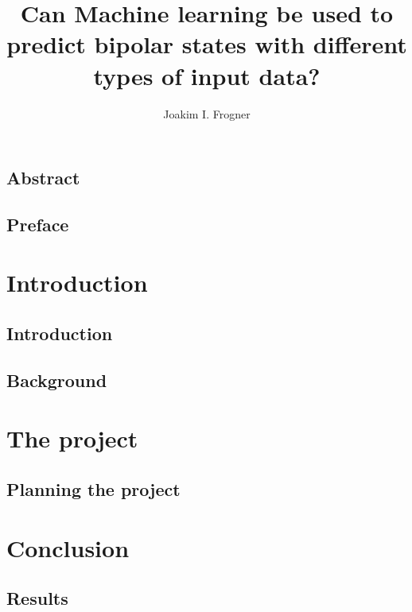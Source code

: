 \documentclass[UKenglish]{ifimaster}
\title{Can Machine learning be used to predict bipolar states with different types of input data?}
\subtitle{
}
\author{Joakim I. Frogner}
\begin{document}
\duoforside[dept={Department of Informatics},
program={Programming and Networks},
long]

\frontmatter{}
\chapter*{Abstract}

\tableofcontents{}
\listoffigures{}
\listoftables{}

\chapter*{Preface}

\mainmatter{}
\part{Introduction}

\chapter{Introduction}


\chapter{Background}



\part{The project}

\chapter{Planning the project}

\part{Conclusion}
 
\chapter{Results} 



\backmatter{}
\printbibliography
\end{document}

